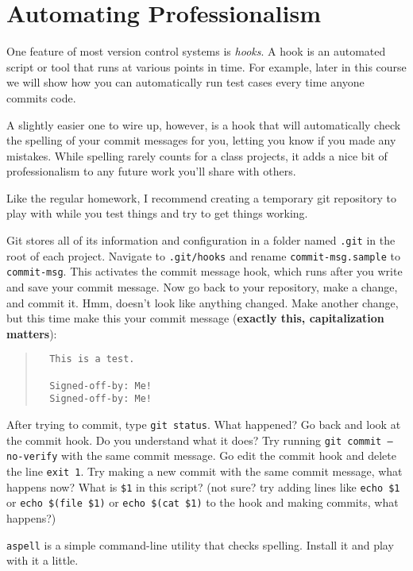 \documentclass{article}
\begin{document}
\section{Automating Professionalism}

One feature of most version control systems is \emph{hooks}. A hook is an
automated script or tool that runs at various points in time. For example,
later in this course we will show how you can automatically run test cases
every time anyone commits code.

\medskip
\noindent
A slightly easier one to wire up, however, is a hook that will automatically
check the spelling of your commit messages for you, letting you know if you
made any mistakes. While spelling rarely counts for a class projects, it
adds a nice bit of professionalism to any future work you'll share with
others.

\medskip
\noindent
Like the regular homework, I recommend creating a temporary git repository to
play with while you test things and try to get things working.

\medskip
\noindent
Git stores all of its information and configuration in a folder named
\texttt{.git} in the root of each project. Navigate to \texttt{.git/hooks} and
rename \texttt{commit-msg.sample} to \texttt{commit-msg}. This activates the
commit message hook, which runs after you write and save your commit message.
Now go back to your repository, make a change, and commit it. Hmm, doesn't
look like anything changed. Make another change, but this time make this your
commit message (\textbf{exactly this, capitalization matters}):
\begin{quote}
  \begin{verbatim}
  This is a test.

  Signed-off-by: Me!
  Signed-off-by: Me!\end{verbatim}
\end{quote}
After trying to commit, type \texttt{git status}. What happened? Go back and
look at the commit hook. Do you understand what it does? Try running
\texttt{git commit --no-verify} with the same commit message. Go edit the
commit hook and delete the line \texttt{exit 1}. Try making a new commit with
the same commit message, what happens now? What is \texttt{\$1} in this
script?  (not sure? try adding lines like \texttt{echo~\$1} or
\texttt{echo~\$(file~\$1)} or \texttt{echo~\$(cat~\$1)} to the hook and making
commits, what happens?)

\medskip
\noindent
\texttt{aspell} is a simple command-line utility that checks spelling. Install
it and play with it a little.
\end{document}
